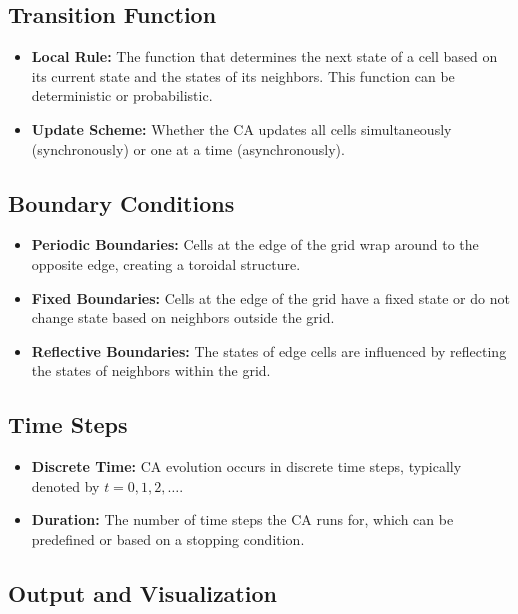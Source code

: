 \documentclass[9pt,a4paper,twoside]{tau-class/tau}
\begin{document}
\subsection{Transition Function}

\begin{itemize}
    \item \textbf{Local Rule:} The function that determines the next state of a cell based on its current state and the states of its neighbors. This function can be deterministic or probabilistic.
    \item \textbf{Update Scheme:} Whether the CA updates all cells simultaneously (synchronously) or one at a time (asynchronously).
\end{itemize}

\subsection{Boundary Conditions}

\begin{itemize}
    \item \textbf{Periodic Boundaries:} Cells at the edge of the grid wrap around to the opposite edge, creating a toroidal structure.
    \item \textbf{Fixed Boundaries:} Cells at the edge of the grid have a fixed state or do not change state based on neighbors outside the grid.
    \item \textbf{Reflective Boundaries:} The states of edge cells are influenced by reflecting the states of neighbors within the grid.
\end{itemize}

\subsection{Time Steps}

\begin{itemize}
    \item \textbf{Discrete Time:} CA evolution occurs in discrete time steps, typically denoted by \( t = 0, 1, 2, \ldots \).
    \item \textbf{Duration:} The number of time steps the CA runs for, which can be predefined or based on a stopping condition.
\end{itemize}

\subsection{Output and Visualization}
\end{document}
